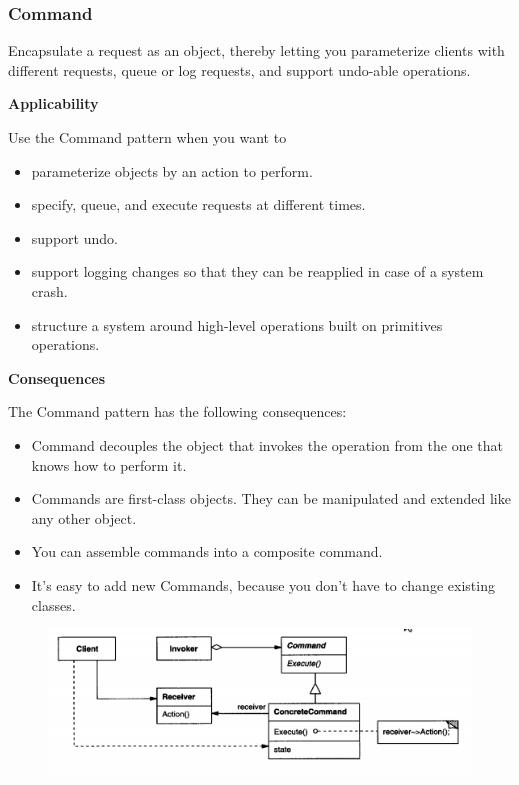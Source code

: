\documentclass{article}
\begin{document}
\newpage
\subsubsection{Command}
Encapsulate a request as an object, thereby letting you parameterize clients with different requests, queue or log requests, and support undo-able
operations.

\textbf{Applicability}

Use the Command pattern when you want to

\begin{itemize}
    \item parameterize objects by an action to perform.
    \item specify, queue, and execute requests at different times.
    \item support undo.
    \item support logging changes so that they can be reapplied in case of a system crash.
    \item structure a system around high-level operations built on primitives operations.
\end{itemize}

\textbf{Consequences}

The Command pattern has the following consequences:
\begin{itemize}
    \item Command decouples the object that invokes the operation from the one that knows how to perform it.
    \item Commands are first-class objects. They can be manipulated and extended like any other object.
    \item You can assemble commands into a composite command.
    \item It's easy to add new Commands, because you don't have to change existing classes.
\end{itemize}

\begin{figure}[h]
    \centering
    \includegraphics[width=14cm]{diagrams/pattern-14-command.png}
\end{figure}
\end{document}
